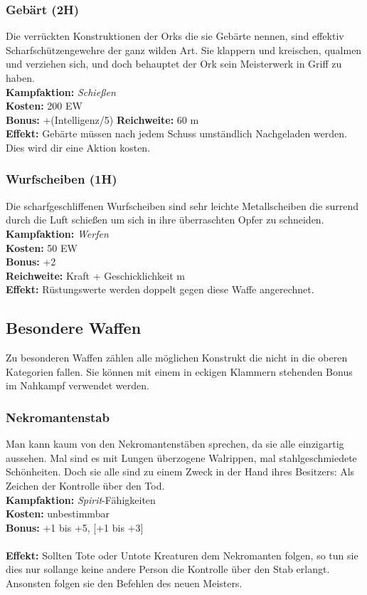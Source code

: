 \subsubsection*{Gebärt (2H)} \label{ar:gebärt}
Die verrückten Konstruktionen der Orks die sie Gebärte nennen, sind effektiv Scharfschützengewehre der ganz wilden Art. Sie klappern und kreischen, qualmen und verziehen sich, und doch behauptet der Ork sein Meisterwerk in Griff zu haben.\\
\textbf{Kampfaktion:} \textit{Schießen}\\
\textbf{Kosten:} 200 EW\\
\textbf{Bonus:} +(Intelligenz/5)
\textbf{Reichweite:} 60 m\\
\textbf{Effekt:} Gebärte müssen nach jedem Schuss umständlich Nachgeladen werden. Dies wird dir eine Aktion kosten.

\subsubsection*{Wurfscheiben (1H)} \label{ar:wurfscheiben}
Die scharfgeschliffenen Wurfscheiben sind sehr leichte Metallscheiben die surrend durch die Luft schießen um sich in ihre überraschten Opfer zu schneiden.\\
\textbf{Kampfaktion:} \textit{Werfen}\\
\textbf{Kosten:} 50 EW\\
\textbf{Bonus:} +2\\
\textbf{Reichweite:} Kraft + Geschicklichkeit m\\
\textbf{Effekt:} Rüstungswerte werden doppelt gegen diese Waffe angerechnet.


\subsection*{Besondere Waffen}
Zu besonderen Waffen zählen alle möglichen Konstrukt die nicht in die oberen Kategorien fallen. Sie können mit einem in eckigen Klammern stehenden Bonus im Nahkampf verwendet werden.

\subsubsection*{Nekromantenstab} \label{ar:nekromantenstab}
Man kann kaum von den Nekromantenstäben sprechen, da sie alle einzigartig aussehen. Mal sind es mit Lungen überzogene Walrippen, mal stahlgeschmiedete Schönheiten. Doch sie alle sind zu einem Zweck in der Hand ihres Besitzers: Als Zeichen der Kontrolle über den Tod.\\
\textbf{Kampfaktion:} \textit{Spirit}-Fähigkeiten\\
\textbf{Kosten:} unbestimmbar\\
\textbf{Bonus:} +1 bis +5, [+1 bis +3]\\\\
\textbf{Effekt:} Sollten Tote oder Untote Kreaturen dem Nekromanten folgen, so tun sie dies nur sollange keine andere Person die Kontrolle über den Stab erlangt. Ansonsten folgen sie den Befehlen des neuen Meisters.

